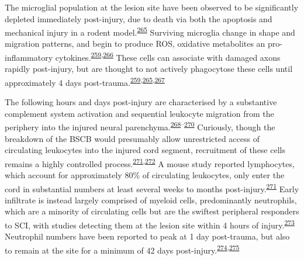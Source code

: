 \documentclass[
]{article}
\begin{document}
The microglial population at the lesion site have been observed to be significantly depleted immediately post-injury, due to death via both the apoptosis and mechanical injury in a rodent model.\textsuperscript{\protect\hyperlink{ref-bellver-landete_microglia_2019}{265}}
Surviving microglia change in shape and migration patterns, and begin to produce ROS, oxidative metabolites an pro-inflammatory cytokines.\textsuperscript{\protect\hyperlink{ref-pineau_proinflammatory_2007}{259},\protect\hyperlink{ref-bastien_cytokine_2014}{266}}
These cells can associate with damaged axons rapidly post-injury, but are thought to not actively phagocytose these cells until approximately 4 days post-trauma.\textsuperscript{\protect\hyperlink{ref-pineau_proinflammatory_2007}{259},\protect\hyperlink{ref-bellver-landete_microglia_2019}{265},\protect\hyperlink{ref-greenhalgh_differences_2014}{267}}

The following hours and days post-injury are characterised by a substantive complement system activation and sequential leukocyte migration from the periphery into the injured neural parenchyma.\textsuperscript{\protect\hyperlink{ref-brennan_complement_2015}{268}--\protect\hyperlink{ref-qiao_complement_2006}{270}}
Curiously, though the breakdown of the BSCB would presumably allow unrestricted access of circulating leukocytes into the injured cord segment, recruitment of these cells remains a highly controlled process.\textsuperscript{\protect\hyperlink{ref-beck_quantitative_2010}{271},\protect\hyperlink{ref-brennan_complement_2019}{272}}
A mouse study reported lymphocytes, which account for approximately 80\% of circulating leukocytes, only enter the cord in substantial numbers at least several weeks to months post-injury.\textsuperscript{\protect\hyperlink{ref-beck_quantitative_2010}{271}}
Early infiltrate is instead largely comprised of myeloid cells, predominantly neutrophils, which are a minority of circulating cells but are the swiftest peripheral responders to SCI, with studies detecting them at the lesion site within 4 hours of injury.\textsuperscript{\protect\hyperlink{ref-wright_neutrophil_2010}{273}}
Neutrophil numbers have been reported to peak at 1 day post-trauma, but also to remain at the site for a minimum of 42 days post-injury.\textsuperscript{\protect\hyperlink{ref-okada_pathophysiological_2016}{274},\protect\hyperlink{ref-kigerl_comparative_2006}{275}}
\end{document}
